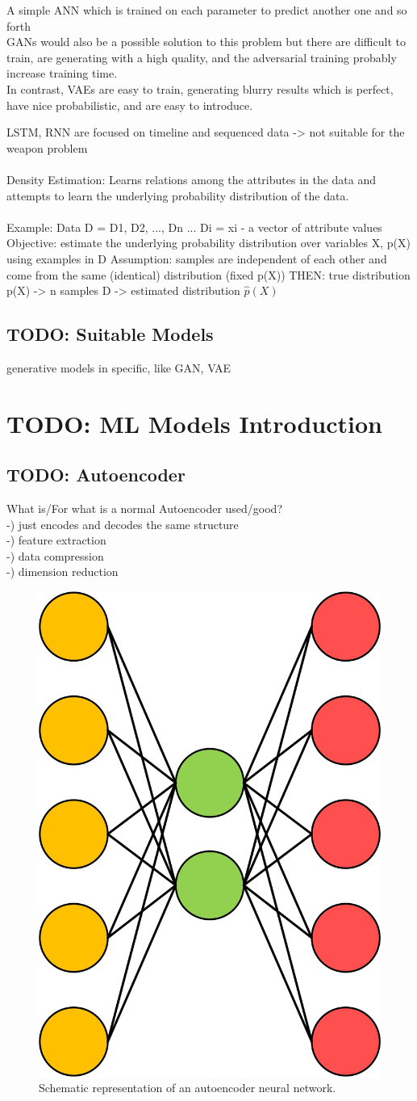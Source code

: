 \documentclass[MGS,Master,english]{twbook}%
\begin{document}
{A simple ANN which is trained on each parameter to predict another one and so forth\\
GANs would also be a possible solution to this problem but there are difficult to train, are generating with a high quality, and the adversarial training probably increase training time.\\
In contrast, VAEs are easy to train, generating blurry results which is perfect, have nice probabilistic, and are easy to introduce.

}
LSTM, RNN are focused on timeline and sequenced data -> not suitable for the weapon problem\\
\\
Density Estimation: Learns relations among the attributes in the data and attempts to learn the underlying probability distribution of the data.\\
\\
Example: Data D = {D1, D2, ..., Dn} ... Di = xi - a vector of attribute values
Objective: estimate the underlying probability distribution over variables X, p(X) using examples in D
Assumption: samples are independent of each other and come from the same (identical) distribution (fixed p(X))
THEN:
true distribution p(X) -> n samples D -> estimated distribution $\hat{p}(X)$

\subsection{TODO: Suitable Models}
generative models in specific, like GAN, VAE 



\section{TODO: \acl{ML} Models Introduction}

\subsection{TODO: Autoencoder}
What is/For what is a normal Autoencoder used/good? \\
-) just encodes and decodes the same structure\\
-) feature extraction\\
-) data compression\\
-) dimension reduction
\begin{figure}[!htbp]
	\centering
	\includegraphics[width=0.3\linewidth]{PICs/NNs/autoencoder}
	\caption{Schematic representation of an autoencoder neural network.}
\end{figure}
\end{document}
